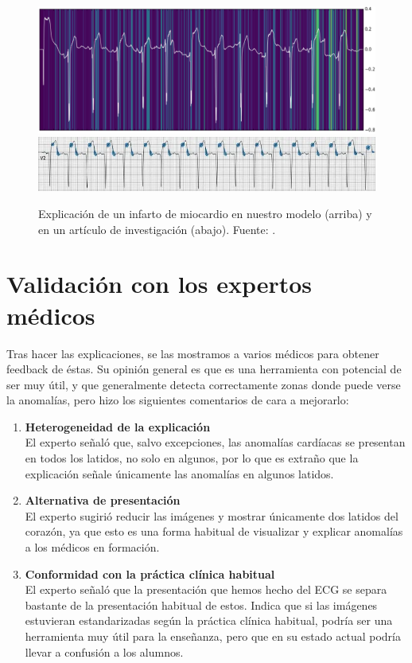 \begin{figure}
	\centering
	\includegraphics[width=0.9\linewidth]{Imagenes/Vectorial/Feature_7.png}
	\includegraphics[width=0.9\linewidth]{Imagenes/Vectorial/V2.png}
	\caption{Explicación de un infarto de miocardio en nuestro modelo (arriba) y en un artículo de investigación (abajo). Fuente: \cite{gustafsson2022deep}.}
	\label{fig:explicacionvs}
\end{figure}

\section{Validación con los expertos médicos}
Tras hacer las explicaciones, se las mostramos a varios médicos para obtener feedback de éstas. Su opinión general es que es una herramienta con potencial de ser muy útil, y que generalmente detecta correctamente zonas donde puede verse la anomalías, pero hizo los siguientes comentarios de cara a mejorarlo:
\begin{enumerate}
	\item \textbf{Heterogeneidad de la explicación} \\
	El experto señaló que, salvo excepciones, las anomalías cardíacas se presentan en todos los latidos, no solo en algunos, por lo que es extraño que la explicación señale únicamente las anomalías en algunos latidos.
	\item \textbf{Alternativa de presentación} \\
	El experto sugirió reducir las imágenes y mostrar únicamente dos latidos del corazón, ya que esto es una forma habitual de visualizar y explicar anomalías a los médicos en formación.
	\item \textbf{Conformidad con la práctica clínica habitual} \\
	El experto señaló que la presentación que hemos hecho del ECG se separa bastante de la presentación habitual de estos. Indica que si las imágenes estuvieran estandarizadas según la práctica clínica habitual, podría ser una herramienta muy útil para la enseñanza, pero que en su estado actual podría llevar a confusión a los alumnos.
\end{enumerate}

